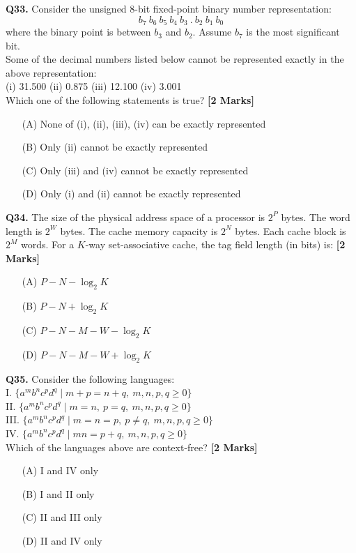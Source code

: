 \documentclass[11pt]{article}
\newcommand{\questionb}[2]{
    \noindent\textbf{Q#2.} #1 \hfill \textbf{[2 Marks]}
}
\begin{document}
\questionb{Consider the unsigned 8-bit fixed-point binary number representation:\\
\[
b_7\ b_6\ b_5\ b_4\ b_3\ .\ b_2\ b_1\ b_0
\]
where the binary point is between \( b_3 \) and \( b_2 \). Assume \( b_7 \) is the most significant bit.\\
Some of the decimal numbers listed below cannot be represented exactly in the above representation:\\
(i) 31.500 \quad (ii) 0.875 \quad (iii) 12.100 \quad (iv) 3.001\\
Which one of the following statements is true?}{33}
\begin{enumerate}
    \item[(A)] None of (i), (ii), (iii), (iv) can be exactly represented
    \item[(B)] Only (ii) cannot be exactly represented
    \item[(C)] Only (iii) and (iv) cannot be exactly represented
    \item[(D)] Only (i) and (ii) cannot be exactly represented
\end{enumerate}
\vspace{0.5cm}

\questionb{The size of the physical address space of a processor is \( 2^P \) bytes. The word length is \( 2^W \) bytes. The cache memory capacity is \( 2^N \) bytes. Each cache block is \( 2^M \) words. For a \( K \)-way set-associative cache, the tag field length (in bits) is:}{34}
\begin{enumerate}
    \item[(A)] \( P - N - \log_2 K \)
    \item[(B)] \( P - N + \log_2 K \)
    \item[(C)] \( P - N - M - W - \log_2 K \)
    \item[(D)] \( P - N - M - W + \log_2 K \)
\end{enumerate}
\vspace{0.5cm}

\questionb{Consider the following languages:\\
I. \( \{ a^m b^n c^p d^q \mid m + p = n + q,\ m,n,p,q \geq 0 \} \)\\
II. \( \{ a^m b^n c^p d^q \mid m = n,\ p = q,\ m,n,p,q \geq 0 \} \)\\
III. \( \{ a^m b^n c^p d^q \mid m = n = p,\ p \neq q,\ m,n,p,q \geq 0 \} \)\\
IV. \( \{ a^m b^n c^p d^q \mid mn = p + q,\ m,n,p,q \geq 0 \} \)\\
Which of the languages above are context-free?}{35}
\begin{enumerate}
    \item[(A)] I and IV only
    \item[(B)] I and II only
    \item[(C)] II and III only
    \item[(D)] II and IV only
\end{enumerate}
\vspace{0.5cm}
\end{document}
